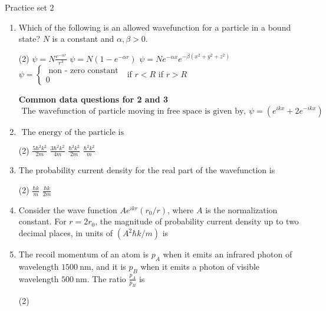 \newpage
\begin{abox}
	Practice set 2
	\end{abox}
\begin{enumerate}
	\item Which of the following is an allowed wavefunction for a particle in a bound state? $N$ is a constant and $\alpha, \beta>0$.
{	}

\begin{tasks}(2)
	\task[\textbf{A.}] $\psi=N \frac{e^{-\alpha r}}{r^{3}}$
	\task[\textbf{B.}]$\psi=N\left(1-e^{-\alpha r}\right)$
	\task[\textbf{C.}]$\psi=N e^{-\alpha x} e^{-\beta\left(x^{2}+y^{2}+z^{2}\right)}$
	\task[\textbf{D.}]$\psi=\left\{\begin{array}{l}\text { non - zero constant } \\ 0\end{array}\right.$
	if $r<R$ if $r>R$
\end{tasks}
\textbf{Common data questions for 2 and 3}\\
$\text { The wavefunction of particle moving in free space is given by, } \psi=\left(e^{i k x}+2 e^{-i k x}\right)$\\
	\item $\text { The energy of the particle is }$
	{}
\begin{tasks}(2)
	\task[\textbf{A.}] $\frac{5 \hbar^{2} k^{2}}{2 m}$
	\task[\textbf{B.}]$\frac{3 \hbar^{2} k^{2}}{4 m}$
	\task[\textbf{C.}]$\frac{\hbar^{2} k^{2}}{2 m}$
	\task[\textbf{D.}]$\frac{\hbar^{2} k^{2}}{m}$
\end{tasks}
	\item The probability current density for the real part of the wavefunction is
\begin{tasks}(2)
	\task[\textbf{B.}]$\frac{\hbar k}{m}$
	\task[\textbf{C.}]$\frac{\hbar k}{2 m}$
\end{tasks}
	\item Consider the wave function $A e^{i k r}\left(r_{0} / r\right)$, where $A$ is the normalization constant.
	For $r=2 r_{0}$, the magnitude of probability current density up to two decimal places, in units of $\left(A^{2} \hbar k / m\right)$ is
	{}
	\item The recoil momentum of an atom is $p_{A}$ when it emits an infrared photon of wavelength $1500 \mathrm{~nm}$, and it is $p_{B}$ when it emits a photon of visible wavelength $500 \mathrm{~nm}$. The ratio $\frac{p_{A}}{p_{B}}$ is
	{}
\begin{tasks}(2)

\end{tasks}
\end{enumerate}
